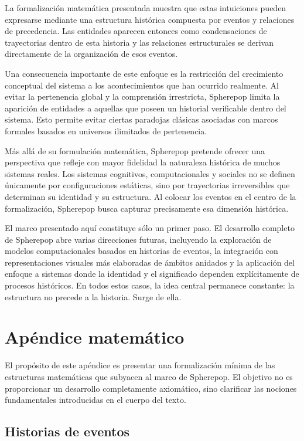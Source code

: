 \documentclass[12pt]{article}
\begin{document}
La formalización matemática presentada muestra que estas intuiciones pueden expresarse mediante una estructura histórica compuesta por eventos y relaciones de precedencia. Las entidades aparecen entonces como condensaciones de trayectorias dentro de esta historia y las relaciones estructurales se derivan directamente de la organización de esos eventos.

Una consecuencia importante de este enfoque es la restricción del crecimiento conceptual del sistema a los acontecimientos que han ocurrido realmente. Al evitar la pertenencia global y la comprensión irrestricta, Spherepop limita la aparición de entidades a aquellas que poseen un historial verificable dentro del sistema. Esto permite evitar ciertas paradojas clásicas asociadas con marcos formales basados en universos ilimitados de pertenencia.

Más allá de su formulación matemática, Spherepop pretende ofrecer una perspectiva que refleje con mayor fidelidad la naturaleza histórica de muchos sistemas reales. Los sistemas cognitivos, computacionales y sociales no se definen únicamente por configuraciones estáticas, sino por trayectorias irreversibles que determinan su identidad y su estructura. Al colocar los eventos en el centro de la formalización, Spherepop busca capturar precisamente esa dimensión histórica.

El marco presentado aquí constituye sólo un primer paso. El desarrollo completo de Spherepop abre varias direcciones futuras, incluyendo la exploración de modelos computacionales basados en historias de eventos, la integración con representaciones visuales más elaboradas de ámbitos anidados y la aplicación del enfoque a sistemas donde la identidad y el significado dependen explícitamente de procesos históricos. En todos estos casos, la idea central permanece constante: la estructura no precede a la historia. Surge de ella.


\newpage
\appendix

\section{Apéndice matemático}

El propósito de este apéndice es presentar una formalización mínima de las estructuras matemáticas que subyacen al marco de Spherepop. El objetivo no es proporcionar un desarrollo completamente axiomático, sino clarificar las nociones fundamentales introducidas en el cuerpo del texto.

\subsection{Historias de eventos}
\end{document}

